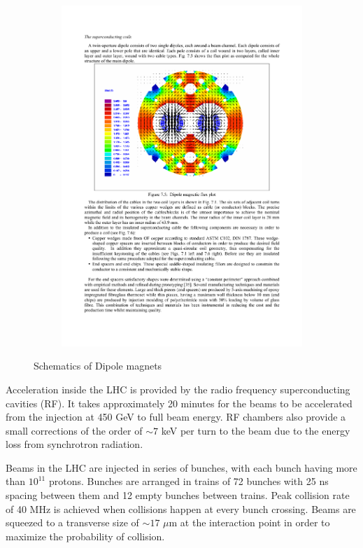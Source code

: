 \begin{figure}[htbp]
\begin{subfigure}{.5\textwidth}
  		\includegraphics[width=\linewidth]{Figures/LHC_MagVec.pdf}
  		\caption{}
  		\label{fig:LHC_MagVec}
	\end{subfigure}
	\caption[Schematics of dipole magnets]{Schematics of Dipole magnets \cite{Evans:2008zzb, Bruning:782076}}
	\label{fig:LHC_mag}
\end{figure}

\par Acceleration inside the LHC is provided by the radio frequency superconducting cavities (RF). It takes approximately 20 minutes for the beams to be accelerated from the injection at 450 GeV to full beam energy. RF chambers also provide a small corrections of the order of $\sim 7$ keV per turn to the beam due to the energy loss from synchrotron radiation.  
\par Beams in the LHC are injected in series of bunches, with each bunch having more than $10^{11}$ protons. Bunches are arranged in trains of 72 bunches with 25 ns spacing between them and 12 empty bunches between trains. Peak collision rate of 40 MHz is achieved when collisions happen at every bunch crossing. Beams are squeezed to a transverse size of $\sim 17$ $\mu$m at the interaction point in order to maximize the probability of collision.  
    

